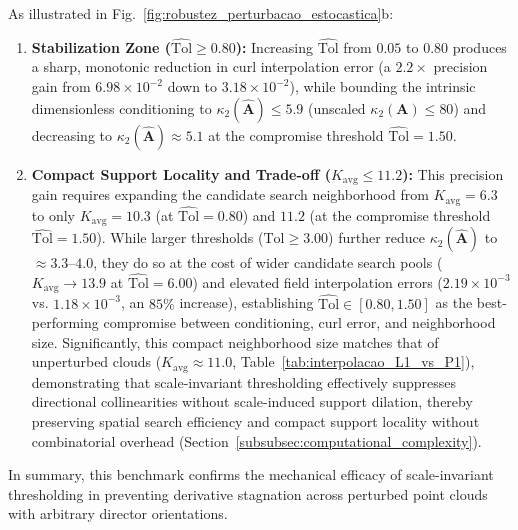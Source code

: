 \documentclass[preprint,12pt]{elsarticle}
\begin{document}
As illustrated in Fig.~\ref{fig:robustez_perturbacao_estocastica}b:
\begin{enumerate}
    \item \textbf{Stabilization Zone ($\widehat{\mathrm{Tol}} \ge 0.80$):} Increasing $\widehat{\mathrm{Tol}}$ from $0.05$ to $0.80$ produces a sharp, monotonic reduction in curl interpolation error (a $2.2\times$ precision gain from $6.98 \times 10^{-2}$ down to $3.18 \times 10^{-2}$), while bounding the intrinsic dimensionless conditioning to $\kappa_2(\widehat{\mathbf{A}}) \le 5.9$ (unscaled $\kappa_2(\mathbf{A}) \le 80$) and decreasing to $\kappa_2(\widehat{\mathbf{A}}) \approx 5.1$ at the compromise threshold $\widehat{\mathrm{Tol}} = 1.50$.
    \item \textbf{Compact Support Locality and Trade-off ($K_{\mathrm{avg}} \le 11.2$):} This precision gain requires expanding the candidate search neighborhood from $K_{\mathrm{avg}} = 6.3$ to only $K_{\mathrm{avg}} = 10.3$ (at $\widehat{\mathrm{Tol}} = 0.80$) and $11.2$ (at the compromise threshold $\widehat{\mathrm{Tol}} = 1.50$). While larger thresholds ($\widehat{\mathrm{Tol}} \ge 3.00$) further reduce $\kappa_2(\widehat{\mathbf{A}})$ to $\approx 3.3\text{--}4.0$, they do so at the cost of wider candidate search pools ($K_{\mathrm{avg}} \to 13.9$ at $\widehat{\mathrm{Tol}} = 6.00$) and elevated field interpolation errors ($2.19 \times 10^{-3}$ vs. $1.18 \times 10^{-3}$, an $85\%$ increase), establishing $\widehat{\mathrm{Tol}} \in [0.80, 1.50]$ as the best-performing compromise between conditioning, curl error, and neighborhood size. Significantly, this compact neighborhood size matches that of unperturbed clouds ($K_{\mathrm{avg}} \approx 11.0$, Table~\ref{tab:interpolacao_L1_vs_P1}), demonstrating that scale-invariant thresholding effectively suppresses directional collinearities without scale-induced support dilation, thereby preserving spatial search efficiency and compact support locality without combinatorial overhead (Section~\ref{subsubsec:computational_complexity}).
\end{enumerate}

In summary, this benchmark confirms the mechanical efficacy of scale-invariant thresholding in preventing derivative stagnation across perturbed point clouds with arbitrary director orientations.


\end{document}
